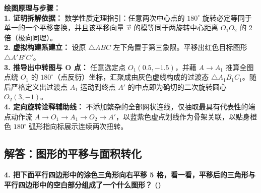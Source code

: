 \vspace{0.4cm}
{\small\color{blue!70!black}
\textbf{绘图原理与步骤：}\\
\textbf{1. 证明拆解依据：} 数学性质定理指引：任意两次中心点的 $180^\circ$ 旋转必定等同于单一的一个平移变换，并且该平移向量 $\vec{v}$ 的模等同于两旋转中心距离 $O_1 O_2$ 的 2 倍（极向同理）。\\
\textbf{2. 虚拟构建系建立：} 设原 $\triangle ABC$ 左下角置于第三象限。平移出红色目标图形 $\triangle A'B'C'$。\\
\textbf{3. 推导出中转图与 O 点：} 任意选定点 $O_1(0.5, -1.5)$，并藉 $A \to A_1$ 推算全图点绕 $O_1$ 的 $180^\circ$（点反衍）坐标，汇聚成由灰色虚线构成的过渡态 $\triangle A_1B_1C_1$。随后严格定义出过渡点 $A_1$ 运动到终点 $A'$ 的中点即为确切的二次旋转圆心 $O_2(3,-1)$。\\
\textbf{4. 定向旋转诠释辅助线：} 不添加繁杂的全部网状连线，仅抽取最具有代表性的端点动作流 $A \to O_1 \to A_1 \to O_2 \to A'$，以蓝紫色虚点划线作为骨架关联，以贴身橙色 $180^\circ$ 弧形指向标展示连续两次扭转。
}

\newpage

\newpage

\subsection{解答：图形的平移与面积转化}

\vspace{0.4cm}

\noindent\textbf{4. 把下面平行四边形中的涂色三角形向右平移 5 格，看一看，平移后的三角形与平行四边形中的空白部分组成了一个什么图形？ ()}

\vspace{0.8cm}

